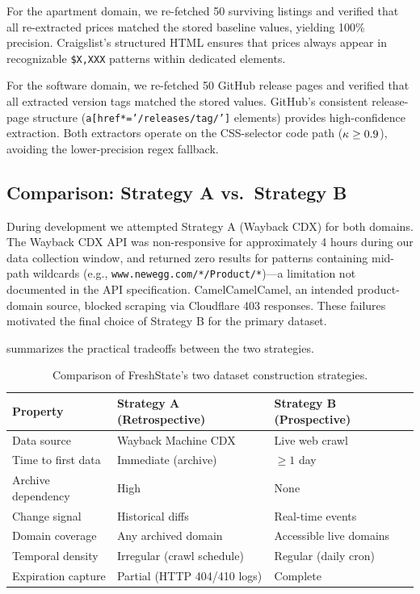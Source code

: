 For the apartment domain, we re-fetched 50 surviving listings and verified that all
re-extracted prices matched the stored baseline values, yielding 100\% precision.
Craigslist's structured HTML ensures that prices always appear in recognizable
\texttt{\$X,XXX} patterns within dedicated elements.

For the software domain, we re-fetched 50 GitHub release pages and verified that
all extracted version tags matched the stored values. GitHub's consistent release-page
structure (\texttt{a[href*='/releases/tag/']} elements) provides high-confidence
extraction. Both extractors operate on the CSS-selector code path ($\kappa \geq 0.9$),
avoiding the lower-precision regex fallback.

\subsection{Comparison: Strategy A vs.\ Strategy B}

During development we attempted Strategy A (Wayback CDX) for both domains.
The Wayback CDX API was non-responsive for approximately 4 hours during our data
collection window, and returned zero results for patterns containing mid-path
wildcards (e.g., \texttt{www.newegg.com/*/Product/*})---a limitation not documented
in the API specification. CamelCamelCamel, an intended product-domain source,
blocked scraping via Cloudflare 403 responses. These failures motivated the
final choice of Strategy B for the primary dataset.

 summarizes the practical tradeoffs between the two strategies.

\begin{table}[t]
  \centering
  \caption{Comparison of FreshState's two dataset construction strategies.}
  \label{tab:strategy}
  \begin{tabular}{lll}
    \toprule
    Property & Strategy A (Retrospective) & Strategy B (Prospective) \\
    \midrule
    Data source         & Wayback Machine CDX       & Live web crawl \\
    Time to first data  & Immediate (archive)        & $\geq 1$ day \\
    Archive dependency  & High                       & None \\
    Change signal       & Historical diffs           & Real-time events \\
    Domain coverage     & Any archived domain        & Accessible live domains \\
    Temporal density    & Irregular (crawl schedule) & Regular (daily cron) \\
    Expiration capture  & Partial (HTTP 404/410 logs)& Complete \\
    \bottomrule
  \end{tabular}
\end{table}

